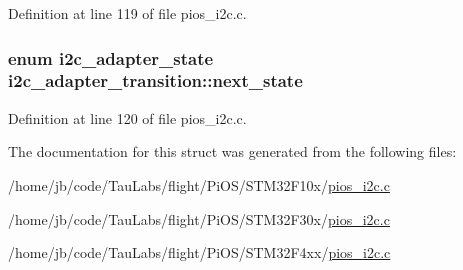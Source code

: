 \-Definition at line 119 of file pios\-\_\-i2c.\-c.

\hypertarget{structi2c__adapter__transition_aeb924ed73ea6faa20f16115e325c9125}{
\subsubsection[{next\-\_\-state}]{\setlength{\rightskip}{0pt plus 5cm}enum {\bf i2c\-\_\-adapter\-\_\-state} {\bf i2c\-\_\-adapter\-\_\-transition\-::next\-\_\-state}}}\label{structi2c__adapter__transition_aeb924ed73ea6faa20f16115e325c9125}


\-Definition at line 120 of file pios\-\_\-i2c.\-c.



\-The documentation for this struct was generated from the following files\-:\begin{DoxyCompactItemize}
\item 
/home/jb/code/\-Tau\-Labs/flight/\-Pi\-O\-S/\-S\-T\-M32\-F10x/\hyperlink{_s_t_m32_f10x_2pios__i2c_8c}{pios\-\_\-i2c.\-c}\item 
/home/jb/code/\-Tau\-Labs/flight/\-Pi\-O\-S/\-S\-T\-M32\-F30x/\hyperlink{_s_t_m32_f30x_2pios__i2c_8c}{pios\-\_\-i2c.\-c}\item 
/home/jb/code/\-Tau\-Labs/flight/\-Pi\-O\-S/\-S\-T\-M32\-F4xx/\hyperlink{_s_t_m32_f4xx_2pios__i2c_8c}{pios\-\_\-i2c.\-c}\end{DoxyCompactItemize}
